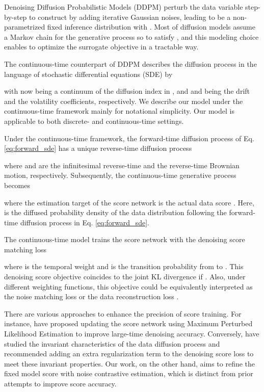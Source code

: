 \documentclass{article}
\theoremstyle{plain}
\theoremstyle{definition}
\theoremstyle{remark}
\begin{document}
Denoising Diffusion Probabilistic Models (DDPM) \cite{ho2020denoising} perturb the data variable  step-by-step to construct  by adding iterative Gaussian noises, leading  to be a non-parametrized fixed inference distribution with . Most \cite{okhotin2023star} of diffusion models assume a Markov chain for the generative process so to satisfy , and this modeling choice enables to optimize the surrogate objective  in a tractable way.

The continuous-time counterpart \cite{song2020score} of DDPM describes the diffusion process in the language of stochastic differential equations (SDE) by

with  now being a continuum of the diffusion index in , and  and  being the drift and the volatility coefficients, respectively. We describe our model under the continuous-time framework mainly for notational simplicity. Our model is applicable to both discrete- and continuous-time settings.

Under the continuous-time framework, the forward-time diffusion process of Eq. \eqref{eq:forward_sde} has a unique reverse-time diffusion process \cite{anderson1982reverse}

where  and  are the infinitesimal reverse-time and the reverse-time Brownian motion, respectively. Subsequently, the continuous-time generative process becomes

where the estimation target of the score network  is the actual data score . Here,  is the diffused probability density of the data distribution following the forward-time diffusion process in Eq. \eqref{eq:forward_sde}.

The continuous-time model trains the score network with the denoising score matching loss \cite{song2019generative}

where  is the temporal weight and  is the transition probability from  to . This denoising score objective coincides to the joint KL divergence  if  \cite{chen2016relation, song2021maximum}. Also, under different weighting functions, this objective could be equivalently interpreted as the noise matching loss  \cite{ho2020denoising} or the data reconstruction loss  \cite{kingma2021variational}.

There are various approaches to enhance the precision of score training. For instance, \citet{kim2022soft, kingma2023understanding, hang2023efficient} have proposed updating the score network using Maximum Perturbed Likelihood Estimation to improve large-time denoising accuracy. Conversely, \citet{lai2022regularizing, daras2023consistent} have studied the invariant characteristics of the data diffusion process and recommended adding an extra regularization term to the denoising score loss to meet these invariant properties. Our work, on the other hand, aims to refine the fixed model score with noise contrastive estimation, which is distinct from prior attempts to improve score accuracy.
\end{document}
